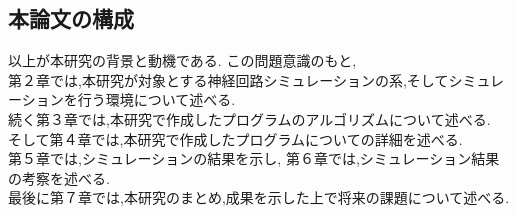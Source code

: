 \subsection{本論文の構成}
以上が本研究の背景と動機である. この問題意識のもと,\\
\indent 第２章では,本研究が対象とする神経回路シミュレーションの系,そしてシミュレーションを行う環境について述べる.\\
\indent 続く第３章では,本研究で作成したプログラムのアルゴリズムについて述べる.\\
\indent そして第４章では,本研究で作成したプログラムについての詳細を述べる.\\
\indent 第５章では,シミュレーションの結果を示し,
\indent 第６章では,シミュレーション結果の考察を述べる.\\
\indent 最後に第７章では,本研究のまとめ,成果を示した上で将来の課題について述べる.\\
